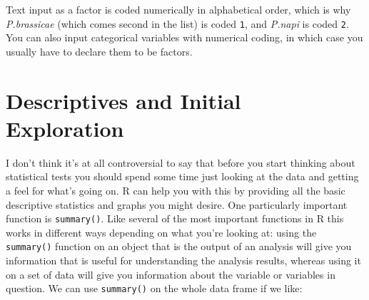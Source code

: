 \documentclass[
]{book}
\newenvironment{Shaded}{\begin{snugshade}}{\end{snugshade}}
\newcommand{\DecValTok}[1]{\textcolor[rgb]{0.00,0.00,0.81}{#1}}
\newcommand{\KeywordTok}[1]{\textcolor[rgb]{0.13,0.29,0.53}{\textbf{#1}}}
\newcommand{\NormalTok}[1]{#1}
\newcommand{\OperatorTok}[1]{\textcolor[rgb]{0.81,0.36,0.00}{\textbf{#1}}}
\begin{document}
\begin{Shaded}
\end{Shaded}

Text input as a factor is coded numerically in alphabetical order, which is why \emph{P.brassicae} (which comes second in the list) is coded \texttt{1}, and \emph{P.napi} is coded \texttt{2}. You can also input categorical variables with numerical coding, in which case you usually have to declare them to be factors.

\hypertarget{descriptives-and-initial-exploration}{%
\section{Descriptives and Initial Exploration}\label{descriptives-and-initial-exploration}}

I don't think it's at all controversial to say that before you start thinking about statistical tests you should spend some time just looking at the data and getting a feel for what's going on. R can help you with this by providing all the basic descriptive statistics and graphs you might desire. One particularly important function is \texttt{summary()}. Like several of the most important functions in R this works in different ways depending on what you're looking at: using the \texttt{summary()} function on an object that is the output of an analysis will give you information that is useful for understanding the analysis results, whereas using it on a set of data will give you information about the variable or variables in question. We can use \texttt{summary()} on the whole data frame if we like:
\end{document}
